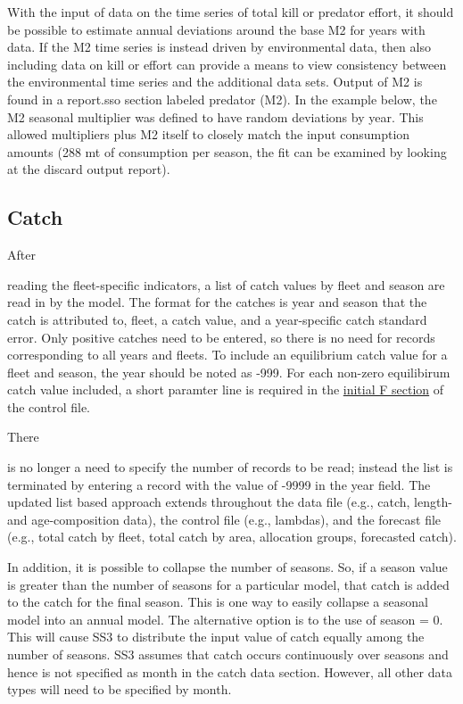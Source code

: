 With the input of data on the time series of total kill or predator effort, it should be possible to estimate annual deviations around the base M2 for years with data. If the M2 time series is instead driven by environmental data, then also including data on kill or effort can provide a means to view consistency between the environmental time series and the additional data sets. Output of M2 is found in a report.sso section labeled predator (M2). In the example below, the M2 seasonal multiplier was defined to have random deviations by year. This allowed multipliers plus M2 itself to closely match the input consumption amounts (288 mt of consumption per season, the fit can be examined by looking at the discard output report).


\subsection{Catch}
\hypertarget{CatchFormat}{After} reading the fleet-specific indicators, a list of catch values by fleet and season are read in by the model. The format for the catches is year and season that the catch is attributed to, fleet, a catch value, and a year-specific catch standard error. Only positive catches need to be entered, so there is no need for records corresponding to all years and fleets. To include an equilibrium catch value for a fleet and season, the year should be noted as -999. For each non-zero equilibirum catch value included, a short paramter line is required in the \hyperlink{InitF}{initial F section} of the control file.

\hypertarget{ListBased}{There} is no longer a need to specify the number of records to be read; instead the list is terminated by entering a record with the value of -9999 in the year field. The updated list based approach extends throughout the data file (e.g., catch, length- and age-composition data), the control file (e.g., lambdas), and the forecast file (e.g., total catch by fleet, total catch by area, allocation groups, forecasted catch).

In addition, it is possible to collapse the number of seasons.  So, if a season value is greater than the number of seasons for a particular model, that catch is added to the catch for the final season.  This is one way to easily collapse a seasonal model into an annual model.  The alternative option is to the use of season = 0.  This will cause SS3 to distribute the input value of catch equally among the number of seasons.  SS3 assumes that catch occurs continuously over seasons and hence is not specified as month in the catch data section.  However, all other data types will need to be specified by month.

